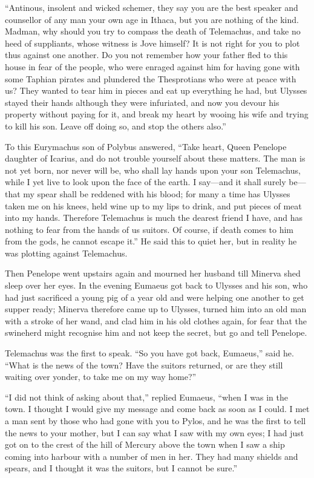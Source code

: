 “Antinous, insolent and wicked schemer, they say you are the best speaker and
counsellor of any man your own age in Ithaca, but you are nothing of the kind.
Madman, why should you try to compass the death of Telemachus, and take no heed
of suppliants, whose witness is Jove himself? It is not right for you to plot
thus against one another. Do you not remember how your father fled to this
house in fear of the people, who were enraged against him for having gone with
some Taphian pirates and plundered the Thesprotians who were at peace with us?
They wanted to tear him in pieces and eat up everything he had, but Ulysses
stayed their hands although they were infuriated, and now you devour his
property without paying for it, and break my heart by wooing his wife and
trying to kill his son. Leave off doing so, and stop the others also.”

To this Eurymachus son of Polybus answered, “Take heart, Queen Penelope
daughter of Icarius, and do not trouble yourself about these matters. The man
is not yet born, nor never will be, who shall lay hands upon your son
Telemachus, while I yet live to look upon the face of the earth. I say—and it
shall surely be—that my spear shall be reddened with his blood; for many a time
has Ulysses taken me on his knees, held wine up to my lips to drink, and put
pieces of meat into my hands. Therefore Telemachus is much the dearest friend I
have, and has nothing to fear from the hands of us suitors. Of course, if death
comes to him from the gods, he cannot escape it.” He said this to quiet her,
but in reality he was plotting against Telemachus.

Then Penelope went upstairs again and mourned her husband till Minerva shed
sleep over her eyes. In the evening Eumaeus got back to Ulysses and his son,
who had just sacrificed a young pig of a year old and were helping one another
to get supper ready; Minerva therefore came up to Ulysses, turned him into an
old man with a stroke of her wand, and clad him in his old clothes again, for
fear that the swineherd might recognise him and not keep the secret, but go and
tell Penelope.

Telemachus was the first to speak. “So you have got back, Eumaeus,” said he.
“What is the news of the town? Have the suitors returned, or are they still
waiting over yonder, to take me on my way home?”

“I did not think of asking about that,” replied Eumaeus, “when I was in the
town. I thought I would give my message and come back as soon as I could. I met
a man sent by those who had gone with you to Pylos, and he was the first to
tell the news to your mother, but I can say what I saw with my own eyes; I had
just got on to the crest of the hill of Mercury above the town when I saw a
ship coming into harbour with a number of men in her. They had many shields and
spears, and I thought it was the suitors, but I cannot be sure.”

